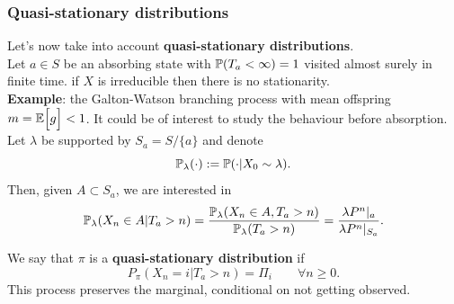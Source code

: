 \documentclass{article}
\begin{document}
\subsubsection{Quasi-stationary distributions}
Let's now take into account \textbf{quasi-stationary distributions}.\\
Let $a\in S$ be an absorbing state with $\mathbb{P}(T_a<\infty)=1$ visited almost surely in finite time. if $X$ is irreducible then there is no stationarity.\\
\textbf{Example}: the Galton-Watson branching process with mean offspring $m=\mathbb{E}\Bigl[{g}\Bigr]<1$.
It could be of interest to study the behaviour before absorption.\\
Let $\lambda$ be supported by $S_a=S/\{a\}$ and denote\[\mathbb{P}_\lambda(\cdot):=\mathbb{P}(\cdot|X_0\sim\lambda).\] Then, given $A\subset S_a$, we are interested in 
\[\mathbb{P}_\lambda(X_n\in A|T_a>n)=\frac{\mathbb{P}_\lambda(X_n\in A,T_a>n)}{\mathbb{P}_\lambda(T_a>n)}=\frac{\lambda P^n|_a}{\lambda P^n|_{S_a}}.\]
\begin{definition}
     We say that $\pi$ is a \textbf{quasi-stationary distribution} if
        \[
        P_\pi (X_n=i|T_a>n)=\Pi_i\qquad \forall n \geqslant 0.
        \]
        This process preserves the marginal, conditional on not getting observed.
\end{definition}
\end{document}
